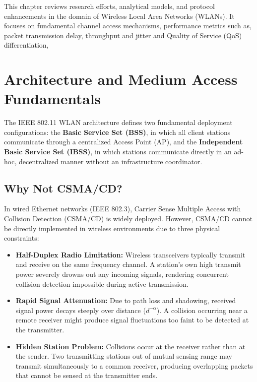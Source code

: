 This chapter reviews research efforts, analytical models, and protocol enhancements in the domain of Wireless Local Area Networks (WLANs). It focuses on fundamental channel access mechanisms, performance metrics such as, packet transmission delay, throughput and jitter and Quality of Service (QoS) differentiation, 

\section{Architecture and Medium Access Fundamentals}
The IEEE 802.11 WLAN architecture defines two fundamental deployment configurations: the \textbf{Basic Service Set (BSS)}, in which all client stations communicate through a centralized Access Point (AP), and the \textbf{Independent Basic Service Set (IBSS)}, in which stations communicate directly in an ad-hoc, decentralized manner without an infrastructure coordinator.

\subsection{Why Not CSMA/CD?}
In wired Ethernet networks (IEEE 802.3), Carrier Sense Multiple Access with Collision Detection (CSMA/CD) is widely deployed. However, CSMA/CD cannot be directly implemented in wireless environments due to three physical constraints:
\begin{itemize}
    \item \textbf{Half-Duplex Radio Limitation:} Wireless transceivers typically transmit and receive on the same frequency channel. A station's own high transmit power severely drowns out any incoming signals, rendering concurrent collision detection impossible during active transmission.
    \item \textbf{Rapid Signal Attenuation:} Due to path loss and shadowing, received signal power decays steeply over distance ($d^{-\alpha}$). A collision occurring near a remote receiver might produce signal fluctuations too faint to be detected at the transmitter.
    \item \textbf{Hidden Station Problem:} Collisions occur at the receiver rather than at the sender. Two transmitting stations out of mutual sensing range may transmit simultaneously to a common receiver, producing overlapping packets that cannot be sensed at the transmitter ends.
\end{itemize}

